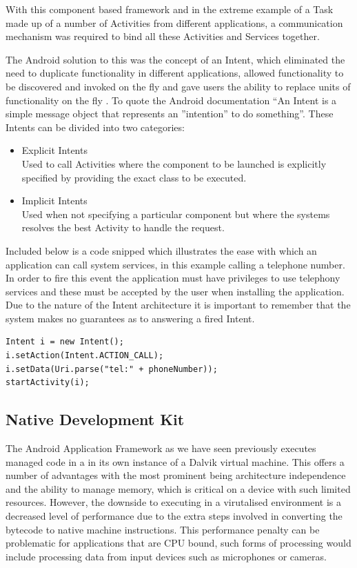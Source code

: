 With this component based framework and in the extreme example of a Task made up of a number of Activities from different applications, a communication mechanism was required to bind all these Activities and Services together.

The Android solution to this was the concept of an Intent, which eliminated the need to duplicate functionality in different applications, allowed functionality to be discovered and invoked on the fly and gave users the ability to replace units of functionality on the fly \cite{rogers09}. To quote the Android documentation “An Intent is a simple message object that represents an ”intention” to do something”. These Intents can be divided into two categories:

\begin{itemize}
\item Explicit Intents\\
Used to call Activities where the component to be launched is explicitly specified by providing the exact class to be executed.
\item Implicit Intents\\
Used when not specifying a particular component but where the systems resolves the best Activity to handle the request.
\end{itemize}

Included below is a code snipped which illustrates the ease with which an application can call system services, in this example calling a telephone number. In order to fire this event the application must have privileges to use telephony services and these must be accepted by the user when installing the application. Due to the nature of the Intent architecture it is important to remember that the system makes no guarantees as to answering a fired Intent.

\begin{lstlisting}
Intent i = new Intent();
i.setAction(Intent.ACTION_CALL);
i.setData(Uri.parse("tel:" + phoneNumber));
startActivity(i);
\end{lstlisting}

\subsection{Native Development Kit}
The Android Application Framework as we have seen previously executes managed code in a in its own instance of a Dalvik virtual machine. This offers a number of advantages with the most prominent being architecture independence and the ability to manage memory, which is critical on a device with such limited resources. However, the downside to executing in a virutalised environment is a decreased level of performance due to the extra steps involved in converting the bytecode to native machine instructions. This performance penalty can be problematic for applications that are CPU bound, such forms of processing would include processing data from input devices such as microphones or cameras.

